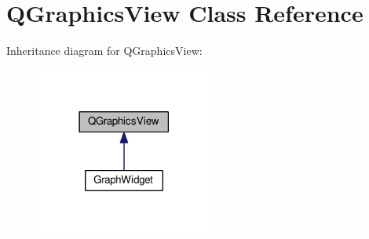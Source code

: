 \hypertarget{classGUI_1_1QGraphicsView}{}\section{Q\+Graphics\+View Class Reference}
\label{classGUI_1_1QGraphicsView}


Inheritance diagram for Q\+Graphics\+View\+:
\nopagebreak
\begin{figure}[H]
\begin{center}
\leavevmode
\includegraphics[width=165pt]{classGUI_1_1QGraphicsView__inherit__graph}
\end{center}
\end{figure}
